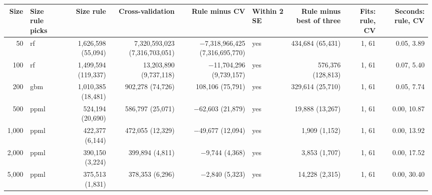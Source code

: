 \begin{tabular}{rlrrrlrrr}
\toprule
Size & Size rule picks & Size rule & Cross-validation & Rule minus CV & Within 2 SE & Rule minus best of three & Fits: rule, CV & Seconds: rule, CV \\
\midrule
50 & rf & 1,626,598 (55,094) & 7,320,593,023 (7,316,703,051) & $-$7,318,966,425 (7,316,695,770) & yes & 434,684 (65,431) & 1, 61 & 0.05, 3.89 \\
100 & rf & 1,499,594 (119,337) & 13,203,890 (9,737,118) & $-$11,704,296 (9,739,157) & yes & 576,376 (128,813) & 1, 61 & 0.07, 5.40 \\
200 & gbm & 1,010,385 (18,481) & 902,278 (74,726) & 108,106 (75,791) & yes & 329,614 (25,710) & 1, 61 & 0.05, 7.74 \\
500 & ppml & 524,194 (20,690) & 586,797 (25,071) & $-$62,603 (21,879) & yes & 19,888 (13,267) & 1, 61 & 0.00, 10.87 \\
1,000 & ppml & 422,377 (6,144) & 472,055 (12,329) & $-$49,677 (12,094) & yes & 1,909 (1,152) & 1, 61 & 0.00, 13.92 \\
2,000 & ppml & 390,150 (3,224) & 399,894 (4,811) & $-$9,744 (4,368) & yes & 3,853 (1,707) & 1, 61 & 0.00, 17.52 \\
5,000 & ppml & 375,513 (1,831) & 378,353 (6,296) & $-$2,840 (5,323) & yes & 14,228 (2,315) & 1, 61 & 0.00, 30.40 \\
\bottomrule
\end{tabular}
